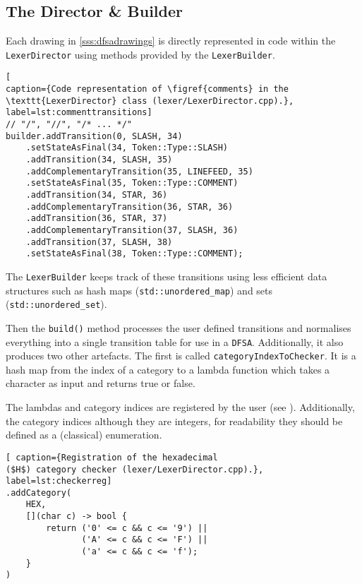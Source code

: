 \subsection{The Director \& Builder}

Each drawing in \ref{sss:dfsadrawings} is directly represented
in code within the \texttt{LexerDirector} using methods provided
by the \texttt{LexerBuilder}.

\begin{lstlisting}[
caption={Code representation of \figref{comments} in the
\texttt{LexerDirector} class (lexer/LexerDirector.cpp).},
label=lst:commenttransitions]
// "/", "//", "/* ... */"
builder.addTransition(0, SLASH, 34)
    .setStateAsFinal(34, Token::Type::SLASH)
    .addTransition(34, SLASH, 35)
    .addComplementaryTransition(35, LINEFEED, 35)
    .setStateAsFinal(35, Token::Type::COMMENT)
    .addTransition(34, STAR, 36)
    .addComplementaryTransition(36, STAR, 36)
    .addTransition(36, STAR, 37)
    .addComplementaryTransition(37, SLASH, 36)
    .addTransition(37, SLASH, 38)
    .setStateAsFinal(38, Token::Type::COMMENT);
\end{lstlisting}

The \texttt{LexerBuilder} keeps track of these
transitions using less efficient data structures
such as hash maps (\texttt{std::unordered\_map})
and sets (\texttt{std::unordered\_set}).

Then the \texttt{build()} method processes the user defined
transitions and normalises everything into a single transition
table for use in a \texttt{DFSA}. Additionally, it also produces
two other artefacts. The first is called
\texttt{categoryIndexToChecker}. It is a hash map from the index
of a category to a lambda function which takes a character as
input and returns true or false.

The lambdas and category indices are registered by the user (see
). Additionally, the category indices
although they are integers, for readability they should be
defined as a (classical) enumeration.

\pagebreak

\begin{lstlisting}[ caption={Registration of the hexadecimal
($H$) category checker (lexer/LexerDirector.cpp).},
label=lst:checkerreg]
.addCategory(
    HEX,
    [](char c) -> bool {
        return ('0' <= c && c <= '9') ||
               ('A' <= c && c <= 'F') ||
               ('a' <= c && c <= 'f');
    }
)
\end{lstlisting}


